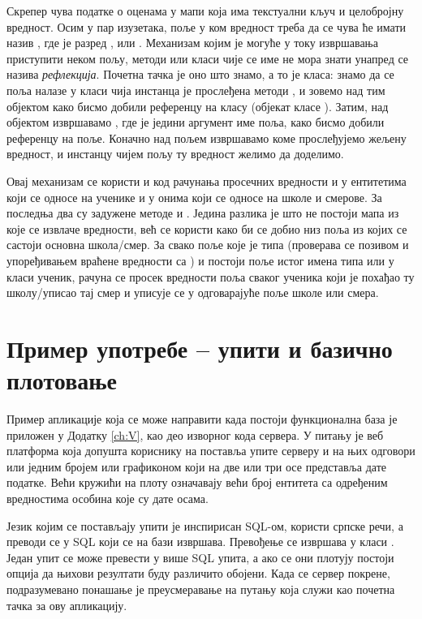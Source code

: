 Скрепер чува податке о оценама у мапи која има текстуални кључ и целобројну вредност. Осим у пар изузетака, поље у ком вредност треба да се чува ће имати назив , где је разред ,  или . Механизам којим је могуће у току извршавања приступити неком пољу, методи или класи чије се име не мора знати унапред се назива \emph{рефлекција}. Почетна тачка је оно што знамо, а то је класа: знамо да се поља налазе у класи чија инстанца је прослеђена методи , и зовемо  над тим објектом како бисмо добили референцу на класу (објекат класе ). Затим, над  објектом извршавамо , где је једини аргумент име поља, како бисмо добили референцу на поље. Коначно над пољем извршавамо  коме прослеђујемо  жељену вредност, и инстанцу чијем пољу ту вредност желимо да доделимо.

Овај механизам се користи и код рачунања просечних вредности и у ентитетима који се односе на ученике и у онима који се односе на школе и смерове. За последња два су задужене методе  и . Једина разлика је што не постоји мапа из које се извлаче вредности, већ се користи  како би се добио низ поља из којих се састоји основна школа/смер. За свако поље које је типа  (проверава се позивом  и упоређивањем враћене вредности са ) и постоји поље истог имена типа  или  у класи ученик, рачуна се просек вредности поља сваког ученика који је похађао ту школу/уписао тај смер и уписује се у одговарајуће поље школе или смера.



\section{Пример употребе -- упити и базично плотовање}

Пример апликације која се може направити када постоји функционална база је приложен у Додатку \ref{ch:V}, као део изворног кода сервера. У питању је веб платформа која допушта кориснику на поставља упите серверу и на њих одговори или једним бројем или графиконом који на две или три осе представља дате податке. Већи кружићи на плоту означавају већи број ентитета са одређеним вредностима особина које су дате осама. 

Језик којим се постављају упити је инспирисан SQL-ом, користи српске речи, а преводи се у SQL који се на бази извршава. Превођење се извршава у класи . Један упит се може превести у више SQL упита, а ако се они плотују постоји опција да њихови резултати буду различито обојени. Када се сервер покрене, подразумевано понашање је преусмеравање на путању  која служи као почетна тачка за ову апликацију. 

